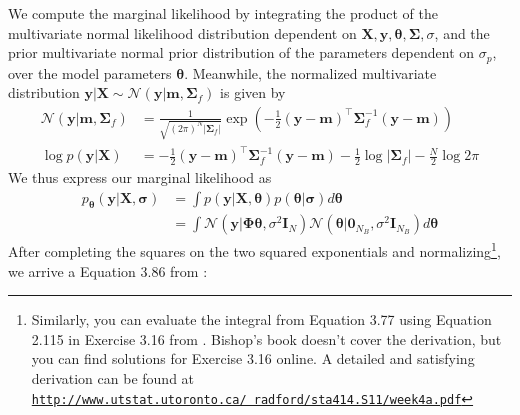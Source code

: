 \documentclass{article}
\begin{document}
We compute the marginal likelihood by integrating the product of the multivariate normal likelihood distribution dependent on $\mathbf{X},\mathbf{y},\boldsymbol{\theta},\boldsymbol{\Sigma}, \sigma$, and the prior multivariate normal prior distribution of the parameters dependent on $\sigma_p$, over the model parameters $\boldsymbol{\theta}$. Meanwhile, the normalized multivariate distribution $\mathbf{y}|\mathbf{X} \sim \mathcal{N}(\mathbf{y}|\mathbf{m},\boldsymbol{\Sigma}_f)$ is given by
\begin{equation}
\begin{split}
    \mathcal{N}(\mathbf{y}|\mathbf{m},\boldsymbol{\Sigma}_f)& =\frac{1}{\sqrt{(2\pi)^N |\boldsymbol{\Sigma}_f|}} \exp \left(-\frac{1}{2}(\mathbf{y}-\mathbf{m})^\top\boldsymbol{\Sigma}_f^{-1}(\mathbf{y}-\mathbf{m})\right) \\
   \log p(\mathbf{y}|\mathbf{X})& = -\frac{1}{2}(\mathbf{y}-\mathbf{m})^\top\boldsymbol{\Sigma}_f^{-1}(\mathbf{y}-\mathbf{m})-\frac{1}{2}\log |\boldsymbol{\Sigma}_f|-\frac{N}{2}\log 2\pi
   \end{split}
\end{equation} We  thus express our marginal likelihood as
\begin{equation}
\begin{split}
    p_{\boldsymbol{\theta}}(\mathbf{y}|\mathbf{X},\boldsymbol{\sigma})&=\int p(\mathbf{y}|\mathbf{X},\boldsymbol{\theta})p(\boldsymbol{\theta}|\boldsymbol{\sigma})d\boldsymbol{\theta} \\
    &= \int \mathcal{N}(\mathbf{y}|\boldsymbol{\Phi}\boldsymbol{\theta},\sigma^2\mathbf{I}_N)\mathcal{N}(\boldsymbol{\theta}|\mathbf{0}_{N_B},\sigma^2\mathbf{I}_{N_B})d\boldsymbol{\theta}
    \end{split}
\end{equation}After completing the squares on the two squared exponentials and normalizing\footnote{Similarly, you can evaluate the integral from Equation 3.77 using Equation 2.115 in Exercise 3.16 from \cite{bishop}. Bishop's book doesn't cover the derivation, but you can find solutions for Exercise 3.16 online. A detailed and satisfying derivation can be found at \href{ http://www.utstat.utoronto.ca/~radford/sta414.S11/week4a.pdf}{\texttt{http://www.utstat.utoronto.ca/~radford/sta414.S11/week4a.pdf}}}, we arrive a Equation 3.86 from \cite{bishop}: 
\end{document}
